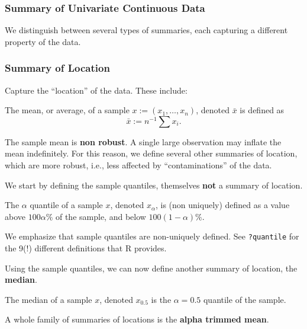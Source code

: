 \documentclass[]{book}
\theoremstyle{definition}
\theoremstyle{definition}
\theoremstyle{definition}
\theoremstyle{remark}
\let\BeginKnitrBlock\begin \let\EndKnitrBlock\end
\begin{document}
\subsubsection{Summary of Univariate Continuous
Data}\label{summary-of-univariate-continuous-data}

We distinguish between several types of summaries, each capturing a
different property of the data.

\subsubsection{Summary of Location}\label{summary-of-location}

Capture the ``location'' of the data. These include:

\BeginKnitrBlock{definition}[Average]
\protect\hypertarget{def:unnamed-chunk-113}{}{\label{def:unnamed-chunk-113}
{} }The mean, or average, of a sample
\(x:=(x_1,\dots,x_n)\), denoted \(\bar x\) is defined as
\[ \bar x := n^{-1} \sum x_i. \]
\EndKnitrBlock{definition}

The sample mean is \textbf{non robust}. A single large observation may
inflate the mean indefinitely. For this reason, we define several other
summaries of location, which are more robust, i.e., less affected by
``contaminations'' of the data.

We start by defining the sample quantiles, themselves \textbf{not} a
summary of location.

\BeginKnitrBlock{definition}[Quantiles]
\protect\hypertarget{def:unnamed-chunk-114}{}{\label{def:unnamed-chunk-114}
{} }The \(\alpha\) quantile of a sample \(x\),
denoted \(x_\alpha\), is (non uniquely) defined as a value above
\(100 \alpha \%\) of the sample, and below \(100 (1-\alpha) \%\).
\EndKnitrBlock{definition}

We emphasize that sample quantiles are non-uniquely defined. See
\texttt{?quantile} for the 9(!) different definitions that R provides.

Using the sample quantiles, we can now define another summary of
location, the \textbf{median}.

\BeginKnitrBlock{definition}[Median]
\protect\hypertarget{def:unnamed-chunk-115}{}{\label{def:unnamed-chunk-115}
{} }The median of a sample \(x\), denoted
\(x_{0.5}\) is the \(\alpha=0.5\) quantile of the sample.
\EndKnitrBlock{definition}

A whole family of summaries of locations is the \textbf{alpha trimmed
mean}.
\end{document}
